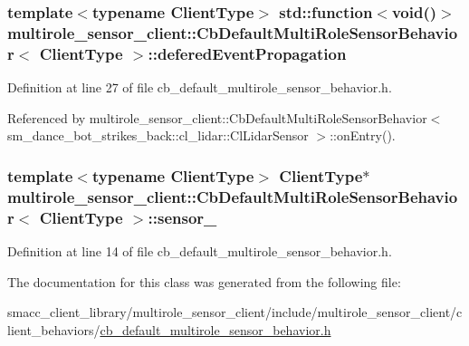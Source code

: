 \subsubsection[{\texorpdfstring{defered\+Event\+Propagation}{deferedEventPropagation}}]{\setlength{\rightskip}{0pt plus 5cm}template$<$typename Client\+Type$>$ std\+::function$<$void()$>$ {\bf multirole\+\_\+sensor\+\_\+client\+::\+Cb\+Default\+Multi\+Role\+Sensor\+Behavior}$<$ Client\+Type $>$\+::defered\+Event\+Propagation}\hypertarget{classmultirole__sensor__client_1_1CbDefaultMultiRoleSensorBehavior_af49bfde7f78897b0e884faae69077013}{}\label{classmultirole__sensor__client_1_1CbDefaultMultiRoleSensorBehavior_af49bfde7f78897b0e884faae69077013}


Definition at line 27 of file cb\+\_\+default\+\_\+multirole\+\_\+sensor\+\_\+behavior.\+h.



Referenced by multirole\+\_\+sensor\+\_\+client\+::\+Cb\+Default\+Multi\+Role\+Sensor\+Behavior$<$ sm\+\_\+dance\+\_\+bot\+\_\+strikes\+\_\+back\+::cl\+\_\+lidar\+::\+Cl\+Lidar\+Sensor $>$\+::on\+Entry().

\subsubsection[{\texorpdfstring{sensor\+\_\+}{sensor_}}]{\setlength{\rightskip}{0pt plus 5cm}template$<$typename Client\+Type$>$ Client\+Type$\ast$ {\bf multirole\+\_\+sensor\+\_\+client\+::\+Cb\+Default\+Multi\+Role\+Sensor\+Behavior}$<$ Client\+Type $>$\+::sensor\+\_\+}\hypertarget{classmultirole__sensor__client_1_1CbDefaultMultiRoleSensorBehavior_a5e4e65ada73da49c2b8579b422b97d0d}{}\label{classmultirole__sensor__client_1_1CbDefaultMultiRoleSensorBehavior_a5e4e65ada73da49c2b8579b422b97d0d}


Definition at line 14 of file cb\+\_\+default\+\_\+multirole\+\_\+sensor\+\_\+behavior.\+h.



The documentation for this class was generated from the following file\+:\begin{DoxyCompactItemize}
\item 
smacc\+\_\+client\+\_\+library/multirole\+\_\+sensor\+\_\+client/include/multirole\+\_\+sensor\+\_\+client/client\+\_\+behaviors/\hyperlink{cb__default__multirole__sensor__behavior_8h}{cb\+\_\+default\+\_\+multirole\+\_\+sensor\+\_\+behavior.\+h}\end{DoxyCompactItemize}
